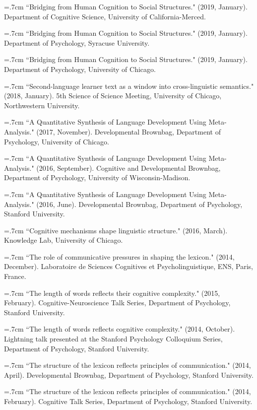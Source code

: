 \documentclass[letterpaper]{article}
\begin{document}
\hangindent=.7cm ``Bridging from Human Cognition to Social Structures." (2019, January). Department of Cognitive Science, University of California-Merced.

\hangindent=.7cm ``Bridging from Human Cognition to Social Structures." (2019, January). Department of Psychology, Syracuse University.

\hangindent=.7cm ``Bridging from Human Cognition to Social Structures." (2019, January). Department of Psychology, University of Chicago.

\hangindent=.7cm ``Second-language learner text as a window into cross-linguistic semantics." (2018, January). 5th Science of Science Meeting,  University of Chicago, Northwestern University.

\hangindent=.7cm ``A Quantitative Synthesis of Language Development Using Meta-Analysis." (2017, November). Developmental Brownbag, Department of Psychology,  University of Chicago.

\hangindent=.7cm ``A Quantitative Synthesis of Language Development Using Meta-Analysis." (2016, September). Cognitive and Developmental Brownbag, Department of Psychology,  University of Wisconsin-Madison.

\hangindent=.7cm ``A Quantitative Synthesis of Language Development Using Meta-Analysis." (2016, June). Developmental Brownbag, Department of Psychology,  Stanford University.

\hangindent=.7cm  ``Cognitive mechanisms shape linguistic structure."  (2016, March).  Knowledge Lab, University of Chicago.

\hangindent=.7cm ``The role of communicative pressures in shaping the lexicon." (2014, December). Laboratoire de Sciences Cognitives et Psycholinguistique, ENS, Paris, France.

\hangindent=.7cm ``The length of words reflects their cognitive complexity." (2015, February). Cognitive-Neuroscience Talk Series, Department of Psychology, Stanford University.

\hangindent=.7cm ``The length of words reflects cognitive complexity." (2014, October). Lightning talk presented at the Stanford Psychology Colloquium Series, Department of Psychology, Stanford University.


\hangindent=.7cm ``The structure of the lexicon reflects principles of communication." (2014, April). Developmental Brownbag, Department of Psychology, Stanford University.

\hangindent=.7cm ``The structure of the lexicon reflects principles of communication." (2014, February). Cognitive Talk Series, Department of Psychology, Stanford University.
\end{document}
